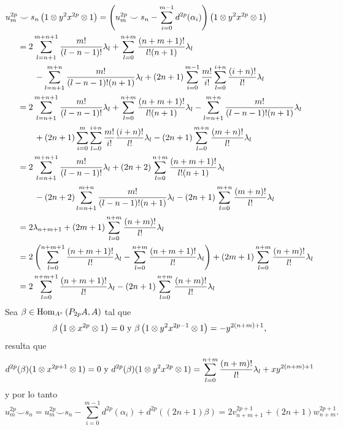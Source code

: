 \documentclass[fleqn,../tesis.tex]{subfiles}
\begin{document}
\begin{align*}
	u_m^{2p}& \smile s_n\left(1 \otimes y^2x^{2p} \otimes 1\right) =
		\left(u_m^{2p} \smile s_n - \sum_{i =0}^{m - 1}d^{2p}(\alpha_i)\right)
		\left(1 \otimes y^2x^{2p} \otimes 1\right)\\
	&=2\sum_{l = n + 1}^{m + n + 1}\frac{m!}{(l - n - 1)!}\lambda_l
		+\sum_{l = 0}^{n + m}\frac{(n + m + 1)!}{l!(n + 1)}\lambda_l\\
	&\qquad -\sum_{l = n + 1}^{m + n}\frac{m!}{(l - n - 1)!(n + 1)}\lambda_l
		+(2n + 1)\sum_{i = 0}^{m - 1}\frac{m!}{i!}\sum_{l = 0}^{i + n}\frac{(i + n)!}{l!}\lambda_l\\
	&= 2\sum_{l = n + 1}^{m + n + 1}\frac{m!}{(l - n - 1)!}\lambda_l
		+\sum_{l = 0}^{n + m}\frac{(n + m + 1)!}{l!(n + 1)}\lambda_l
	 	-\sum_{l = n + 1}^{m + n}\frac{m!}{(l - n - 1)!(n + 1)}\lambda_l\\
	&\qquad+(2n + 1)\sum_{i = 0}^{m}\sum_{l = 0}^{i + n}\frac{m!}{i!}\frac{(i + n)!}{l!}\lambda_l
		-(2n + 1)\sum_{l = 0}^{m + n}\frac{(m + n)!}{l!}\lambda_l\\
	&= 2\sum_{l = n + 1}^{m + n + 1}\frac{m!}{(l - n - 1)!}\lambda_l
		+(2n + 2)\sum_{l = 0}^{n + m}\frac{(n + m + 1)!}{l!(n + 1)}\lambda_l\\
	&\qquad -(2n + 2)\sum_{l = n + 1}^{m + n}\frac{m!}{(l - n - 1)!(n + 1)}\lambda_l
		-(2n + 1)\sum_{l = 0}^{m + n}\frac{(m + n)!}{l!}\lambda_l\\
	&= 2\lambda_{n + m + 1} + (2m + 1)\sum_{l = 0}^{n + m}\frac{(n + m)!}{l!}\lambda_l\\
	&= 2\left(\sum_{l = 0}^{n + m + 1}\frac{(n + m + 1)!}{l!} \lambda_l
		- \sum_{l = 0}^{n + m}\frac{(n + m + 1)!}{l!} \lambda_l\right)
		+ (2m + 1)\sum_{l = 0}^{n + m}\frac{(n + m)!}{l!}\lambda_l\\
	&= 	2\sum_{l = 0}^{n + m + 1}\frac{(n + m + 1)!}{l!} \lambda_l
		- (2n + 1)\sum_{l = 0}^{n + m}\frac{(n + m)!}{l!}\lambda_l
\end{align*}
Sea $\beta \in \operatorname{Hom}_{A^e}\left(P_{2p}A, A\right)$ tal que
\[
	\beta\left(1\otimes x^{2p} \otimes 1\right) = 0 \text{ y } \beta\left(1\otimes y^2x^{2p - 1} \otimes 1\right) = -y^{2(n + m)+ 1},
\]
resulta que
\[
	d^{2p}(\beta)(1\otimes x^{2p + 1} \otimes 1) =0 \text{ y }
		d^{2p}(\beta)(1\otimes y^2x^{2p} \otimes 1) = \sum_{l = 0}^{n + m}\frac{(n + m)!}{l!}\lambda_l + xy^{2(n + m) + 1}
\]
y por lo tanto
\[
	u_m^{2p} \smile s_n = u_m^{2p} \smile s_n - \sum_{i =0}^{m - 1}d^{2p}(\alpha_i) + d^{2p}((2n + 1)\beta)
		= 2v_{n + m + 1}^{2p + 1} + (2n + 1)w_{n + m}^{2p + 1}.
\]
\end{document}
